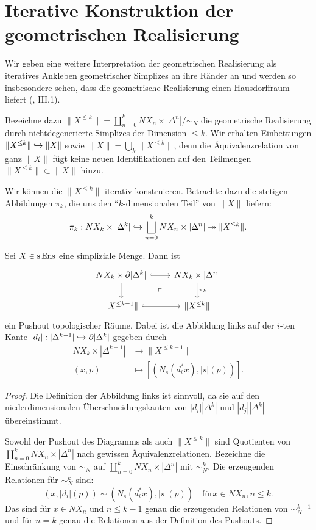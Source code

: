 \section{Iterative Konstruktion der geometrischen Realisierung}

Wir geben eine weitere Interpretation der geometrischen Realisierung
als iteratives Ankleben geometrischer Simplizes an ihre Ränder an und
werden so insbesondere sehen, dass die geometrische Realisierung einen
Hausdorffraum liefert (\cite{Moer}, III.1).

Bezeichne dazu $\|X^{\leq k}\| = \coprod_{n = 0}^k NX_n \times
|\Delta^n| / \sim_N $ die geometrische Realisierung durch
nichtdegenerierte Simplizes der Dimension $\leq k$. Wir erhalten
Einbettungen $\|X^{\leq k}\| \hookrightarrow \|X\|$ sowie $\|X\| = \bigcup_k
\|X^{\leq k}\|$, denn die Äquivalenzrelation von ganz $\|X\|$ fügt
keine neuen Identifikationen auf den Teilmengen $\|X^{\leq k}\|
\subset \|X\|$ hinzu.

Wir können die $\|X^{\leq k}\|$ iterativ konstruieren. Betrachte dazu
die stetigen Abbildungen $\pi_k$, die uns den ``$k$-dimensionalen
Teil'' von $\|X\|$ liefern:
\[ \pi_k: NX_k \times |\Delta^k|
  \hookrightarrow \bigsqcup_{n=0}^k NX_n \times |\Delta^n|
  \twoheadrightarrow \|X^{\leq k}\|. \]

\begin{prop}
  Sei $X \in \operatorname{s}\operatorname{Ens}$ eine simpliziale Menge. Dann ist
  \[ \begin{tikzcd}
    NX_k \times \del |\Delta^k| \arrow[r, hook] \arrow[d]
    \arrow[dr, phantom, "\ulcorner"]
    & NX_k \times |\Delta^n| \arrow[d, "\pi_k"] \\
    \|X^{\leq k-1}\| \arrow[r, hook]
    & \|X^{\leq k}\|
  \end{tikzcd} \]
  ein Pushout topologischer Räume. Dabei ist die Abbildung links auf
  der $i$-ten Kante $|d_i|: |\Delta^{k-1}| \hookrightarrow \partial |\Delta^k|$
  gegeben durch
  \begin{align*}
    NX_k \times |\Delta^{k-1}| &\to \|X^{\leq k-1}\| \\
    (x, p) &\mapsto [(N_s(d_i^* x), |s|(p))].
  \end{align*}
\end{prop}
\begin{proof}
  Die Definition der Abbildung links ist sinnvoll, da sie auf den
  niederdimensionalen Überschneidungskanten von $|d_i| |\Delta^k|$ und
  $|d_j| |\Delta^k|$ übereinstimmt.
  
  Sowohl der Pushout des Diagramms als auch $\|X^{\leq k}\|$ sind
  Quotienten von $\coprod_{n=0}^k NX_n \times |\Delta^n|$ nach
  gewissen Äquivalenzrelationen. Bezeichne die Einschränkung von
  $\sim_N$ auf $\coprod_{n=0}^k NX_n \times |\Delta^n|$ mit
  $\sim_N^k$. Die erzeugenden Relationen für $\sim_N^k$ sind:
  \[ (x, |d_i|(p)) \sim (N_s(d_i^* x), |s|(p))
  \quad \text{für} x \in NX_n, n \leq k. \]
  Das sind für $x \in NX_n$ und $n \leq k-1$ genau die erzeugenden
  Relationen von $\sim_N^{k-1}$ und für $n = k$ genau die Relationen
  aus der Definition des Pushouts.
\end{proof}

